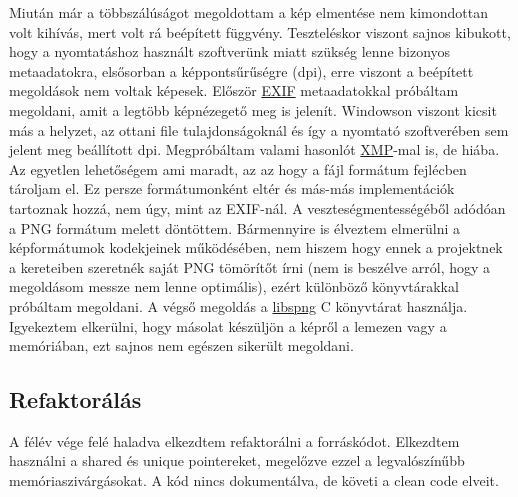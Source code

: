 Miután már a többszálúságot megoldottam a kép elmentése nem kimondottan volt kihívás, mert volt rá beépített függvény. Teszteléskor viszont sajnos kibukott, hogy a nyomtatáshoz használt szoftverünk miatt szükség lenne bizonyos metaadatokra, elsősorban a képpontsűrűségre (dpi), erre viszont a beépített megoldások nem voltak képesek. Először \href{https://en.wikipedia.org/wiki/Exif}{EXIF} metaadatokkal próbáltam megoldani, amit a legtöbb képnézegető meg is jelenít. Windowson viszont kicsit más a helyzet, az ottani file tulajdonságoknál és így a nyomtató szoftverében sem jelent meg beállított dpi. Megpróbáltam valami hasonlót \href{https://en.wikipedia.org/wiki/Extensible_Metadata_Platform}{XMP}-mal is, de hiába. Az egyetlen lehetőségem ami maradt, az az hogy a fájl formátum fejlécben tároljam el. Ez persze formátumonként eltér és más-más implementációk tartoznak hozzá, nem úgy, mint az EXIF-nál. A veszteségmentességéből adódóan a PNG formátum melett döntöttem. Bármennyire is élveztem elmerülni a képformátumok kodekjeinek működésében, nem hiszem hogy ennek a projektnek a kereteiben szeretnék saját PNG tömörítőt írni (nem is beszélve arról, hogy a megoldásom messze nem lenne optimális), ezért különböző könyvtárakkal próbáltam megoldani. A végső megoldás a \href{https://libspng.org/}{libspng} C könyvtárat használja. Igyekeztem elkerülni, hogy másolat készüljön a képről a lemezen vagy a memóriában, ezt sajnos nem egészen sikerült megoldani. 

\subsection{Refaktorálás}

A félév vége felé haladva elkezdtem refaktorálni a forráskódot. Elkezdtem használni a shared és unique pointereket, megelőzve ezzel a legvalószínűbb memóriaszivárgásokat. A kód nincs dokumentálva, de követi a clean code elveit. 
